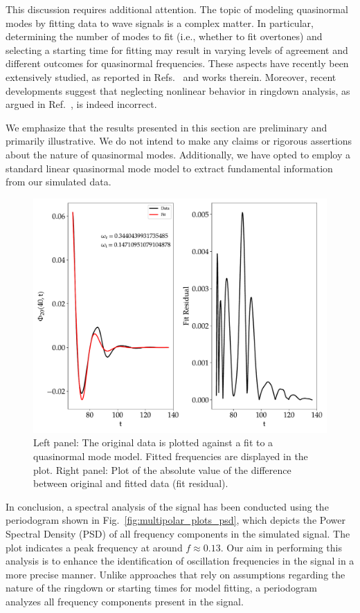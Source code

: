 This discussion requires additional attention. The topic of modeling quasinormal modes by fitting data to wave signals is a complex matter. In particular, determining the number of modes to fit (i.e., whether to fit overtones) and selecting a starting time for fitting may result in varying levels of agreement and different outcomes for quasinormal frequencies. These aspects have recently been extensively studied, as reported in Refs.~\cite{PhysRevD.101.104005, ota2022black} and works therein. Moreover, recent developments suggest that neglecting nonlinear behavior in ringdown analysis, as argued in Ref.~\cite{PhysRevLett.130.081401}, is indeed incorrect.

We emphasize that the results presented in this section are preliminary and primarily illustrative. We do not intend to make any claims or rigorous assertions about the nature of quasinormal modes. Additionally, we have opted to employ a standard linear quasinormal mode model to extract fundamental information from our simulated data.

\begin{figure}[h]
  \centering
  \includegraphics[width=\linewidth]{img/wave_scattering/fit_plot}
  \caption{Left panel: The original data is plotted against a fit to a quasinormal mode model. Fitted frequencies are displayed in the plot. Right panel: Plot of the absolute value of the difference between original and fitted data (fit residual). }
  \label{fig:multipolar_plots_fit}
\end{figure}

In conclusion, a spectral analysis of the signal has been conducted using the periodogram shown in Fig.~\ref{fig:multipolar_plots_psd}, which depicts the Power Spectral Density (PSD) of all frequency components in the simulated signal. The plot indicates a peak frequency at around $f\approx0.13$. Our aim in performing this analysis is to enhance the identification of oscillation frequencies in the signal in a more precise manner. Unlike approaches that rely on assumptions regarding the nature of the ringdown or starting times for model fitting, a periodogram analyzes all frequency components present in the signal.

